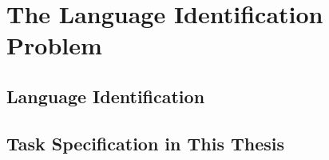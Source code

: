 \section{The Language Identification Problem}

\subsection{Language Identification}
\subsection{Task Specification in This Thesis}
